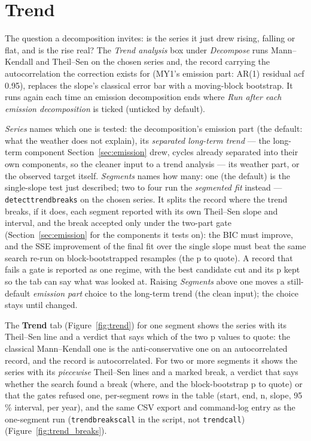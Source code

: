 \documentclass[11pt]{report}
\newcommand{\codeunderscore}{\textunderscore\allowbreak}
\newcommand{\code}[1]{\texttt{\let\_\codeunderscore #1}}
\newcommand{\tab}[1]{\textbf{#1}}
\begin{document}
\section{Trend}\label{sec:trend}
The question a decomposition invites: is the series it just drew rising, falling or flat,
and is the rise real? The \emph{Trend analysis} box under \emph{Decompose} runs
Mann--Kendall and Theil--Sen on the chosen series and, the record carrying the
autocorrelation the correction exists for (MY1's emission part: AR(1) residual acf 0.95),
replaces the slope's classical error bar with a moving-block bootstrap. It runs again
each time an emission decomposition ends where \emph{Run after each emission
decomposition} is ticked (unticked by default).

\emph{Series} names which one is tested: the decomposition's emission part
(the default: what the weather does not explain), its \emph{separated long-term
trend} --- the long-term component Section~\ref{sec:emission} drew, cycles already
separated into their own components, so the cleaner input to a trend analysis --- its
weather part, or the observed target itself. \emph{Segments} names how many:
one (the default) is the single-slope test just described; two to four run the
\emph{segmented fit} instead --- \code{detect\_trend\_breaks} on the chosen
series. It splits the record where the trend breaks, if it does, each segment
reported with its own Theil--Sen slope and interval, and the break accepted only
under the two-part gate (Section~\ref{sec:emission} for the components it tests on):
the BIC must improve, and the SSE improvement of the final fit over the single
slope must beat the same search re-run on block-bootstrapped resamples (the p to
quote). A record that fails a gate is reported as one regime, with the best
candidate cut and its p kept so the tab can say what was looked at. Raising
\emph{Segments} above one moves a still-default \emph{emission part} choice to
the long-term trend (the clean input); the choice stays until changed.

The \tab{Trend} tab (Figure~\ref{fig:trend}) for one segment shows the series
with its Theil--Sen line and a verdict that says which of the two p values to
quote: the classical Mann--Kendall one is the anti-conservative one on an
autocorrelated record, and the record is autocorrelated. For two or more
segments it shows the series with its \emph{piecewise} Theil--Sen lines and a
marked break, a verdict that says whether the search found a break (where, and
the block-bootstrap p to quote) or that the gates refused one, per-segment rows
in the table (start, end, n, slope, 95\,\% interval, per year), and the same
CSV export and command-log entry as the one-segment run
(\code{trend\_breaks\_call} in the script, not \code{trend\_call})
(Figure~\ref{fig:trend_breaks}).
\end{document}
